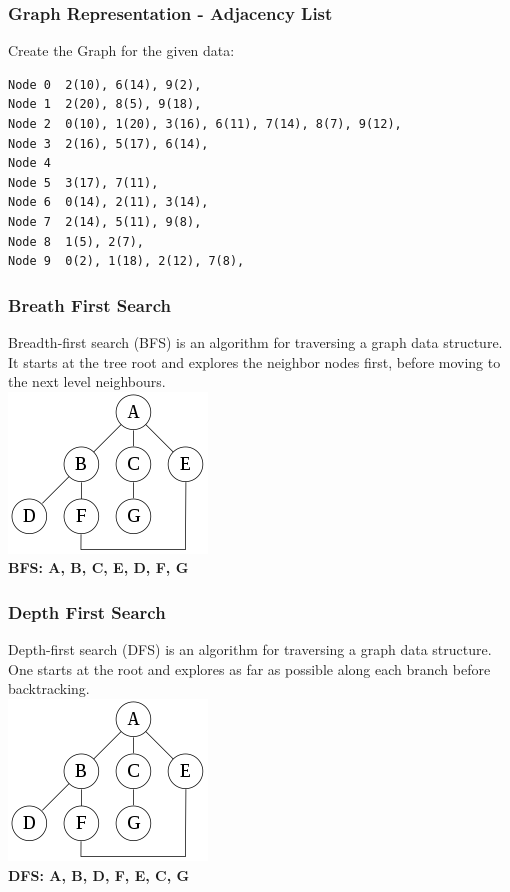 \begin{frame}[fragile]
\frametitle{Graph Representation - Adjacency List}
\begin{exercise}
Create the Graph for the given data:\\
{\tiny
\begin{lstlisting}
Node 0	2(10), 6(14), 9(2), 
Node 1	2(20), 8(5), 9(18), 
Node 2	0(10), 1(20), 3(16), 6(11), 7(14), 8(7), 9(12), 
Node 3	2(16), 5(17), 6(14), 
Node 4	
Node 5	3(17), 7(11), 
Node 6	0(14), 2(11), 3(14), 
Node 7	2(14), 5(11), 9(8), 
Node 8	1(5), 2(7), 
Node 9	0(2), 1(18), 2(12), 7(8),
\end{lstlisting}
}
\end{exercise}
\end{frame}

\begin{frame}[fragile]
\frametitle{Breath First Search}
Breadth-first search (BFS) is an algorithm for traversing a graph data structure. It starts at the tree root and explores the neighbor nodes first, before moving to the next level neighbours.\\
\vspace{3mm}
\includegraphics[scale=0.5]{img/graph2.png}\\
\vspace{3mm}
{\bf BFS: A, B, C, E, D, F, G}
\end{frame}

\begin{frame}[fragile]
\frametitle{Depth First Search}
Depth-first search (DFS) is an algorithm for traversing a graph data structure. One starts at the root and explores as far as possible along each branch before backtracking.\\
\vspace{3mm}
\includegraphics[scale=0.5]{img/graph2.png}\\
\vspace{3mm}
{\bf DFS: A, B, D, F, E, C, G}
\end{frame}

